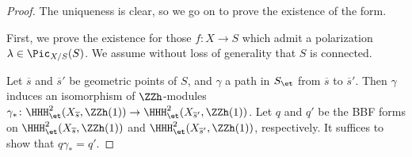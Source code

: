 \begin{proof}
%
%
%
%
The uniqueness is clear, so we go on to prove the existence of the form.

First, we prove the existence for those $f\colon X \rightarrow S$ which admit a polarization $\lambda \in \Pic_{X/S}(S)$. We assume without loss of generality that $S$ is connected.

Let $\overline{s}$ and $\overline{s}'$ be geometric points of $S$, and $\gamma$ a path in $S_{\et}$ from $\overline{s}$ to $\overline{s}'$. Then $\gamma$ induces an isomorphism of $\ZZh$-modules $\gamma_*\colon \HHH^2_{\et}(X_{\overline{s}},\ZZh(1)) \rightarrow \HHH^2_{\et}(X_{\overline{s}'},\ZZh(1))$. Let $q$ and $q'$ be the BBF forms on $\HHH^2_{\et}(X_{\overline{s}},\ZZh(1))$ and $\HHH^2_{\et}(X_{\overline{s}'},\ZZh(1))$, respectively. It suffices to show that $q\gamma_* = q'$. 


\end{proof}
